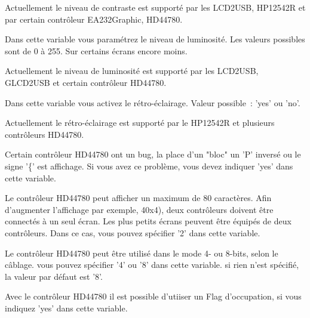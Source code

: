 \begin{description}
  Actuellement le niveau de contraste est supporté par les LCD2USB, HP12542R et
  par certain contrôleur EA232Graphic, HD44780.


  Dans cette variable vous paramétrez le niveau de luminosité. Les valeurs possibles sont
  de 0 à 255. Sur certains écrans encore moins.

  Actuellement le niveau de luminosité est supporté par les LCD2USB, GLCD2USB et
  certain contrôleur HD44780.


  Dans cette variable vous activez le rétro-éclairage. Valeur possible~: 'yes' ou 'no'.

  Actuellement le rétro-éclairage est supporté par le HP12542R et plusieurs contrôleurs HD44780.


  Certain contrôleur HD44780 ont un bug, la place d'un "bloc" un 'P' inversé ou le signe '\{'
  est affichage. Si vous avez ce problème, vous devez indiquer 'yes' dans cette variable.


  Le contrôleur HD44780 peut afficher un maximum de 80 caractères. Afin d'augmenter l'affichage
  par exemple, 40x4), deux contrôleurs doivent être connectés à un seul écran. Les plus petits
  écrans peuvent être équipés de deux contrôleurs. Dans ce cas, vous pouvez spécifier '2' dans
  cette variable.


  Le contrôleur HD44780 peut être utilisé dans le mode 4- ou  8-bits, selon le câblage. vous
  pouvez spécifier '4' ou '8' dans cette variable. si rien n'est spécifié, la valeur
  par défaut est '8'.


  Avec le contrôleur HD44780 il est possible d'utiiser un Flag d'occupation, si vous indiquez
  'yes' dans cette variable.



\end{description}
